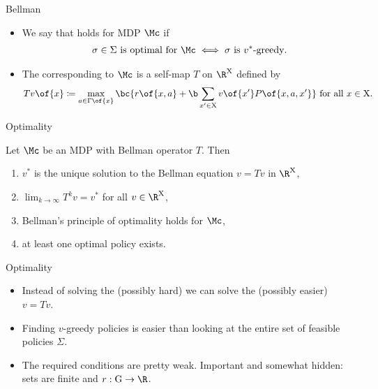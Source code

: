 \documentclass[11pt,xcolor={dvipsnames},aspectratio=159,hyperref={pdftex,pdfpagemode=UseNone,hidelinks,pdfdisplaydoctitle=true},usepdftitle=false]{beamer}
\begin{document}
\begin{frame}{Bellman}   
    \begin{itemize}
        \item We say that  holds for MDP $\Mc$ if \begin{align*}
            \sigma\in\Sigma \text{ is optimal for } \Mc \iff \sigma \text{ is } v^*\text{-greedy}.
        \end{align*}
       \item The  corresponding to $\Mc$ is a self-map $T$ on $\R^\text{X}$ defined by \begin{align*}
           Tv\of{x} \coloneq \max_{a \in \Gamma\of{x}} \bc{r\of{x,a} + \b \sum_{x^\prime \in \text{X}} v\of{x^\prime} P\of{x,a,x^\prime} } \text{ for all } x \in \text{X}.
       \end{align*}
        
    \end{itemize}
    \end{frame}
            
\begin{frame}{Optimality}   
    \begin{theorem}
        Let $\Mc$ be an MDP with Bellman operator $T$. Then \begin{enumerate}
            \item $v^*$ is the unique solution to the Bellman equation $
                v = Tv$ in $\R^\text{X}$,
            \item $\lim_{k\rightarrow\infty} T^k v = v^*$ for all $v \in \R^\text{X}$,
            \item Bellman's principle of optimality holds for $\Mc$,
            \item at least one optimal policy exists.
        \end{enumerate}
    \end{theorem}
    \end{frame}
            
\begin{frame}{Optimality}   
    \begin{itemize}
       \item Instead of solving the (possibly hard)  we can solve the (possibly easier)  $v = Tv$.
       \item Finding $v$-greedy policies is easier than looking at the entire set of feasible policies $\Sigma$.
       \item The required conditions are pretty weak. Important and somewhat hidden: sets are finite and $r: \text{G} \to \R$. 
        \end{itemize}
    \end{frame}   
\end{document}
